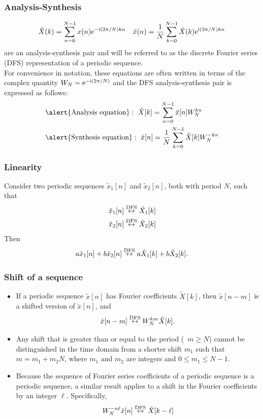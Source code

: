 \begin{frame}
\frametitle{Analysis-Synthesis}
\[
\tilde{X}(k)= \sum_{n=0}^{N-1} x(n) \mathrm{e}^{-\mathrm{i} (2 \pi/N) kn} \quad \tilde{x}(n)= \frac{1}{N} \sum_{k=0}^{N-1} \tilde{X}(k) \mathrm{e}^{\mathrm{i} (2 \pi/N) k n}
\]
are an analysis-synthesis pair and will be referred to as the \alert{discrete Fourier series} (DFS) representation of a periodic sequence.\\
\bigskip
For convenience in notation, these equations are often written in terms of the complex quantity
\alert{$W_{N}= \mathrm{e}^{-\mathrm{i}(2\pi/N)}$} and the DFS analysis-synthesis pair is expressed as follows:
\begin{align*}
&\alert{\text{Analysis\ equation}}:\ \tilde{X}[k]=\sum_{n=0}^{N-1}\tilde{x}[n]W_{N}^{kn} \\
&\alert{\text{Synthesis\ equation}}:\ \tilde{x}[n]=\frac{1}{N}\sum_{k=0}^{N-1}\tilde{X}[k]W_{N}^{-kn}
\end{align*}
\end{frame}


\begin{frame}
\frametitle{Linearity}
Consider two periodic sequences $\tilde{x}_{1}[n]$ and $\tilde{x}_{2}[n]$, both with period $N$, such that
\begin{align*}
&\tilde{x}_{1}[n] \stackrel{\mathrm{DFS}}{\leftrightarrow} \tilde{X}_{1}[k] \\
&\tilde{x}_{2}[n] \stackrel{\mathrm{DFS}}{\leftrightarrow} \tilde{X}_{2}[k]
\end{align*}
Then
$$
a \tilde{x}_{1}[n]+b\tilde{x}_{2}[n]  \stackrel{\mathrm{DFS}}{\leftrightarrow} a \tilde{X}_1[k] +b\tilde{X}_{2}[k].
$$
\end{frame}

\begin{frame}
\frametitle{Shift of a sequence}
\begin{itemize}
\item If a periodic sequence $\tilde{x}[n]$ has Fourier coefficients $\tilde{X}[k]$, then $\tilde{x}[n-m]$ is a shifted version of $\tilde{x}[n]$, and
$$
\tilde{x}[n-m] \stackrel{\mathrm{DFS}}{\leftrightarrow} W_{N}^{km}\tilde{X}[k].
$$
\item Any shift that is greater than or equal to the period (\ie\  $m \geq N$) cannot be distinguished in the time domain from a shorter shift $m_{1}$ such that $m=m_{1}+m_{2}N$, where $m_{1}$ and $m_{2}$ are integers and $0\leq m_{1}\leq N-1$.
\item Because the sequence of Fourier series coefficients of a periodic sequence is a periodic sequence, a similar result applies to a shift in the Fourier coefficients by an integer $\ell$. Specifically,
$$
W_{N}^{-n\ell} \tilde{x}[n] \stackrel{\mathrm{DFS}}{\leftrightarrow} \tilde{X}[k-\ell]
$$
\end{itemize}
\end{frame}

